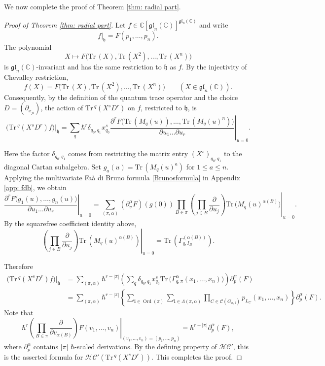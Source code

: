 \documentclass[11pt,reqno]{amsart}
\theoremstyle{definition}
\newcommand{\bbC}{\mathbb{C}}
\newcommand{\gl}{\mathfrak{gl}}
\newcommand{\Tr}{\mathrm{Tr} \,}
\newcommand{\fkh}{\mathfrak{h}}
\newcommand{\hc}{\mathcal{HC}}
\newcommand{\bfl}{\mathbf{l}}
\newcommand{\pa}{\partial}
\newcommand{\Ord}{\operatorname{Ord}}
\newcommand{\mC}{\mathcal{C}}
\newcommand{\bfi}{\mathbf{i}}
\begin{document}
We now complete the proof of Theorem \ref{thm: radial part}.

\begin{proof}[Proof of Theorem \ref{thm: radial part}]
Let \(f\in\bbC[\gl_n (\bbC)]^{\gl_n (\bbC)}\) and write
\[
	f|_{\fkh}=F(p_1,\dots,p_n).
\]
The polynomial
\[
X\longmapsto F\bigl(\Tr(X),\Tr(X^2),\ldots,\Tr(X^n)\bigr)
\]
is \(\gl_n (\bbC)\)-invariant and has the same restriction to \(\fkh\) as
\(f\).  By the injectivity of Chevalley restriction,
\[
f(X)=F\bigl(\Tr(X),\Tr(X^2),\ldots,\Tr(X^n)\bigr)
\qquad (X\in\gl_n (\bbC)).
\]
Consequently, by the definition of the quantum trace operator and the
choice \(D=(\partial_{x_{ji}})\), the action of
\(\Tr^q(X^sD^r)\) on \(f\), restricted to \(\fkh\), is
\[
	\bigl(\Tr^q(X^sD^r)f\bigr)|_{\fkh}
	=
	\sum_q \hbar^r
	{\delta_{q_0, q_1}} x_{q_0}^s
	\left.
	\frac{\partial ^r F\bigl(\Tr(M_q(u)),\dots,\Tr(M_q(u)^n)\bigr)}{\partial u_1 \dots \partial u_r}
	\right|_{u=0}.
\]






Here the factor \(\delta_{q_0, q_1}\) comes from restricting the matrix entry \((X^s)_{q_0, q_1}\) to the diagonal Cartan subalgebra.  
Set \(g_a(u)=\Tr(M_q(u)^a)\) for \(1\leq a\leq n\).  Applying the multivariate Fa\`a di Bruno formula 
\eqref{Brunosformula}
in Appendix \ref{app: fdb}, we obtain
\[
	\left.
	\frac{\partial ^r F\bigl(g_1(u),\dots,g_n(u)\bigr)}{\partial u_1 \dots \partial u_r}
	\right|_{u=0}
	=
	\sum_{(\pi,\alpha)}
	(\pa_v^\alpha F)(g(0))
	\prod_{B\in\pi}
	\left.
	\left(\prod_{j\in B}\frac{\partial}{\partial u_j}\right)
	\Tr\bigl(M_q(u)^{\alpha(B)}\bigr)
	\right|_{u=0}.
\]
By the squarefree coefficient identity above,
\[
\left.
\left(
\prod_{j\in B}\frac{\partial}{\partial u_j}
\right)
\Tr \left(
M_q(u)^{\alpha(B)}
\right)
\right|_{u=0}
=
\Tr \left(
\Gamma_{q,I_B}^{(\alpha(B))}
\right).
\]


Therefore
\begin{equation}\label{for: radial part coeff}
\begin{aligned}
\bigl(\Tr^q(X^sD^r)f\bigr)|_{\fkh}
&=
\sum_{(\pi,\alpha)}\hbar^{r-|\pi|}
\left(
\sum_q\delta_{q_0,q_1}x_{q_0}^s
\Tr\bigl(\Gamma_{q,\pi}^{\alpha}(x_1,\ldots,x_n)\bigr)
\right)
\partial_p^\alpha(F)\\
&=
\sum_{(\pi,\alpha)}\hbar^{r-|\pi|}
\left\{
\sum_{\bfi\in\Ord(\pi)}
\sum_{\bfl\in\Lambda(\pi,\alpha)}
\prod_{C\in\mC(G_{\pi,\bfi})}
p_{L_C}(x_1,\ldots,x_n)
\right\}
\partial_p^\alpha(F).
\end{aligned}
\end{equation}
Note that
\[
\hbar^r
\left.
\left(
\prod_{B\in\pi}
\frac{\partial}{\partial v_{\alpha(B)}}
\right)
F(v_1,\ldots,v_n)
\right|_{(v_1,\ldots,v_n)=(p_1,\ldots,p_n)}
=
\hbar^{r-|\pi|}
\partial_p^\alpha(F),
\]
where \(\partial_p^\alpha\) contains \(|\pi|\) \(\hbar\)-scaled
derivations.  By the defining property of \(\hc'\), this is the asserted formula for \(\hc'(\Tr^q(X^sD^r))\).
This completes the proof.
\end{proof}
\end{document}
